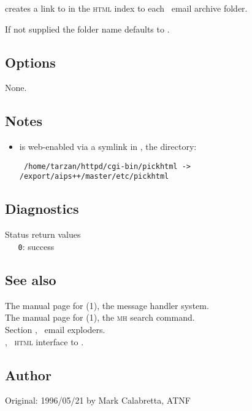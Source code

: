  creates a link to  in the \textsc{html} index
to each \aipspp\ email archive folder.

If not supplied the folder name defaults to .

\subsection*{Options}

None.

\subsection*{Notes}

\begin{itemize}
\item
    is web-enabled via a symlink in
   , the  
   directory:

\begin{verbatim}
 /home/tarzan/httpd/cgi-bin/pickhtml -> /export/aips++/master/etc/pickhtml
\end{verbatim}
\end{itemize}

\subsection*{Diagnostics}

Status return values
\\ \verb+   0+: success

\subsection*{See also}

The manual page for (1), the message handler system.\\
The manual page for (1), the \textsc{mh} search command.\\
Section , \aipspp\ email exploders.\\
, \aipspp\ \textsc{html} interface to .

\subsection*{Author}

Original: 1996/05/21 by Mark Calabretta, ATNF

